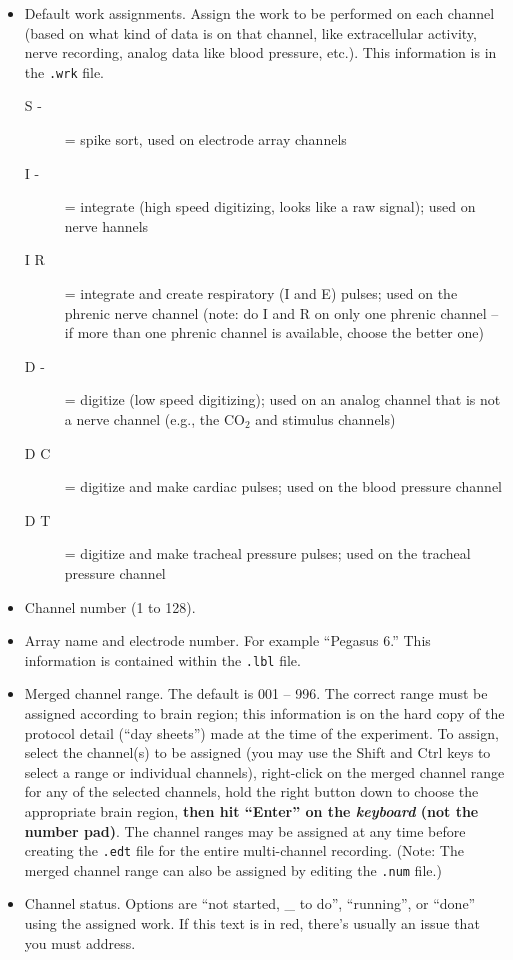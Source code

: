 \documentclass[12pt]{article}
\begin{document}
\begin{itemize}
\item Default work assignments. Assign the work to be performed on
  each channel (based on what kind of data is on that channel, like
  extracellular activity, nerve recording, analog data like blood
  pressure, etc.). This information is in the {\tt *.wrk} file.
\begin{description}
\item[S -] = spike sort, used on electrode array channels
\item[I -] = {integrate} (high speed digitizing, looks like a raw
  signal); used on nerve hannels
\item[I R] = integrate and create respiratory (I and E) pulses; used
  on the phrenic nerve channel (note: do I and R on only one phrenic
  channel -- if more than one phrenic channel is available, choose the
  better one)
\item[D -] = digitize (low speed digitizing); used on an analog
  channel that is not a nerve channel (e.g., the CO$_2$ and stimulus
  channels)
\item[D C] = digitize and make cardiac pulses; used on the blood
  pressure channel
\item[D T] = digitize and make tracheal pressure pulses; used on the
  tracheal pressure channel
\end{description}
\item Channel number (1 to 128).
\item Array name and electrode number. For example ``Pegasus 6.'' This
  information is contained within the {\tt *.lbl} file.
\item Merged channel range. The default is 001 -- 996. The correct
  range must be assigned according to brain region; this information
  is on the hard copy of the protocol detail (``day sheets'') made at
  the time of the experiment. To assign, select the channel(s) to be
  assigned (you may use the Shift and Ctrl keys to select a range or
  individual channels), right-click on the merged channel range for
  any of the selected channels, hold the right button down to choose
  the appropriate brain region, \textbf{then hit ``Enter'' on the
    \textit{keyboard} (not the number pad)}. The channel ranges may be
  assigned at any time before creating the {\tt .edt} file for the
  entire multi-channel recording. (Note: The merged channel range can
  also be assigned by editing the {\tt *.num} file.)
\item Channel status. Options are ``not started, \_ to do'',
  ``running'', or ``done'' using the assigned work. If this text is in
  red, there's usually an issue that you must address.
\end{itemize}
\end{document}

